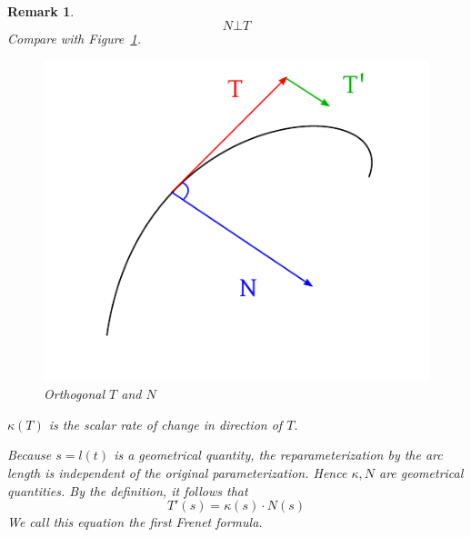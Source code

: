 \documentclass{article}
\newtheorem{remark}{Remark}  \numberwithin{remark}{section}
\begin{document}
\begin{remark}
  \[ N \bot T \]
  Compare with Figure~\ref{img:orthoTN}.
  \begin{figure}[t]
    \begin{center}
      \includegraphics{img/50_orthogonal.pdf}
      \caption{Orthogonal $T$ and $N$}
      \label{img:orthoTN}
    \end{center}
  \end{figure}
  $\kappa(T)$ is the scalar rate of change in direction of $T$.

  Because $s = l(t)$ is a geometrical quantity, the reparameterization by the arc length is independent of the original parameterization.
  Hence $\kappa, N$ are geometrical quantities. By the definition, it follows that
  \[ T'(s) = \kappa(s) \cdot N(s) \]
  We call this equation the \emph{first Frenet formula}.
\end{remark}
\end{document}
